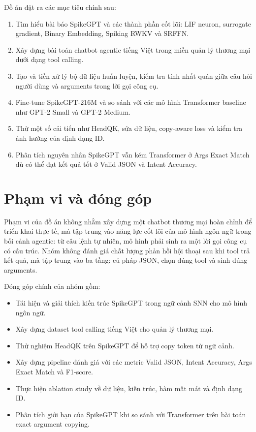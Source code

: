\documentclass[12pt,a4paper,oneside]{report}
\newlength{\manualparindent}
\newcommand{\manualindent}{\hspace*{\manualparindent}}
\begin{document}
Đồ án đặt ra các mục tiêu chính sau:

\begin{enumerate}[label=\arabic*.]
  \item Tìm hiểu bài báo SpikeGPT và các thành phần cốt lõi: LIF neuron, surrogate gradient, Binary Embedding, Spiking RWKV và SRFFN.
  \item Xây dựng bài toán chatbot agentic tiếng Việt trong miền quản lý thương mại dưới dạng tool calling.
  \item Tạo và tiền xử lý bộ dữ liệu huấn luyện, kiểm tra tính nhất quán giữa câu hỏi người dùng và arguments trong lời gọi công cụ.
  \item Fine-tune SpikeGPT-216M và so sánh với các mô hình Transformer baseline như GPT-2 Small và GPT-2 Medium.
  \item Thử một số cải tiến như HeadQK, sửa dữ liệu, copy-aware loss và kiểm tra ảnh hưởng của định dạng ID.
  \item Phân tích nguyên nhân SpikeGPT vẫn kém Transformer ở Args Exact Match dù có thể đạt kết quả tốt ở Valid JSON và Intent Accuracy.
\end{enumerate}

\section{Phạm vi và đóng góp}

\manualindent%
Phạm vi của đồ án không nhằm xây dựng một chatbot thương mại hoàn chỉnh để triển khai thực tế, mà tập trung vào năng lực cốt lõi của mô hình ngôn ngữ trong bối cảnh agentic: từ câu lệnh tự nhiên, mô hình phải sinh ra một lời gọi công cụ có cấu trúc. Nhóm không đánh giá chất lượng phản hồi hội thoại sau khi tool trả kết quả, mà tập trung vào ba tầng: cú pháp JSON, chọn đúng tool và sinh đúng arguments.

Đóng góp chính của nhóm gồm:

\begin{itemize}
  \item Tái hiện và giải thích kiến trúc SpikeGPT trong ngữ cảnh SNN cho mô hình ngôn ngữ.
  \item Xây dựng dataset tool calling tiếng Việt cho quản lý thương mại.
  \item Thử nghiệm HeadQK trên SpikeGPT để hỗ trợ copy token từ ngữ cảnh.
  \item Xây dựng pipeline đánh giá với các metric Valid JSON, Intent Accuracy, Args Exact Match và F1-score.
  \item Thực hiện ablation study về dữ liệu, kiến trúc, hàm mất mát và định dạng ID.
  \item Phân tích giới hạn của SpikeGPT khi so sánh với Transformer trên bài toán exact argument copying.
\end{itemize}
\end{document}
